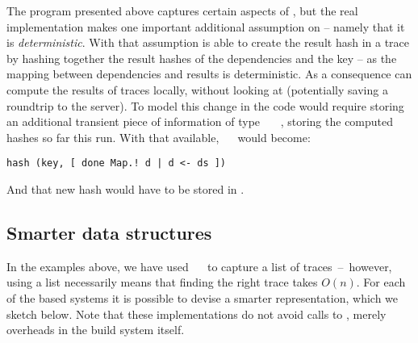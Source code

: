 The program presented above captures certain aspects of \Bazel, but the real
implementation makes one important additional assumption on  -- namely
that it is \textit{deterministic}. With that assumption \Bazel is able to create
the result hash in a trace by hashing together the result hashes of the
dependencies and the key -- as the mapping between dependencies and results is
deterministic. As a consequence \Bazel can compute the results of traces locally,
without looking at  (potentially saving a roundtrip to the server).
To model this change in the code would require storing an additional transient
piece of information  of type ~~~,
storing the computed hashes so far this run. With that available,
~~ would become:
\begin{verbatim}
hash (key, [ done Map.! d | d <- ds ])
\end{verbatim}
And that new hash would have to be stored in .


\vspace{-1mm}
\subsection{Smarter \hs{[Trace]} data structures}\label{sec-smart-traces}
\vspace{-1mm}

In the examples above, we have used \hs{[Trace}~~\hs{v]} to capture a list
of traces~--~however, using a list necessarily means that finding the right trace
takes $O(n)$. For each of the  based systems it is possible to devise
a smarter representation, which we sketch below. Note that these implementations
do not avoid calls to , merely overheads in the build system itself.

